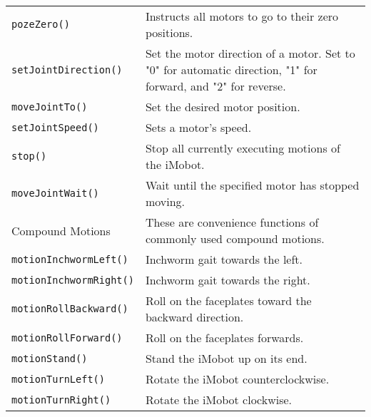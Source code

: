 \begin{table}[!hp]
\begin{center}
\begin{tabular}{p{38 mm}p{77 mm}}
\texttt{pozeZero()} \dotfill & Instructs all motors to go to their zero positions. \\
\texttt{setJointDirection()} \dotfill & Set the motor direction of a motor. Set
to "0" for automatic direction, "1" for forward, and "2" for reverse. \\
\texttt{moveJointTo()} \dotfill & Set the desired motor position. \\
\texttt{setJointSpeed()} \dotfill & Sets a motor's speed. \\
\texttt{stop()} \dotfill & Stop all currently executing motions of the iMobot. \\
\texttt{moveJointWait()} \dotfill & Wait until the specified motor has stopped moving. \\
\hline
Compound Motions & These are convenience functions of commonly used compound motions. \\
\hline
\texttt{motionInchwormLeft()} \dotfill & Inchworm gait towards the left. \\
\texttt{motionInchwormRight()} \dotfill & Inchworm gait towards the right. \\
\texttt{motionRollBackward()} \dotfill & Roll on the faceplates toward the backward direction. \\
\texttt{motionRollForward()} \dotfill & Roll on the faceplates forwards. \\
\texttt{motionStand()} \dotfill & Stand the iMobot up on its end. \\
\texttt{motionTurnLeft()} \dotfill & Rotate the iMobot counterclockwise. \\
\texttt{motionTurnRight()} \dotfill & Rotate the iMobot clockwise. \\
\hline
\end{tabular}
\end{center}
\label{mobilec_api_cbinary}
\end{table}

\newpage

\pagebreak

\pagebreak

\pagebreak

\pagebreak

\pagebreak

\pagebreak

\pagebreak

\pagebreak

\pagebreak

\pagebreak

\pagebreak

\pagebreak

\pagebreak

\pagebreak

\pagebreak

\pagebreak

\pagebreak

\pagebreak

\pagebreak

\pagebreak

\pagebreak

